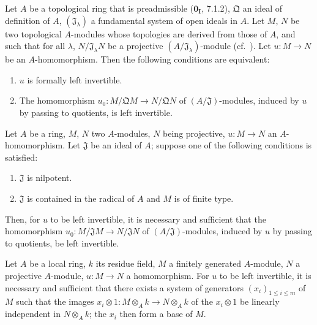 \begin{proposition}[19.1.9]
\label{0.19.1.9}
Let $A$ be a topological ring that is preadmissible ($\mathbf{0_I}$, 7.1.2), $\mathfrak{Q}$ an ideal of definition of $A$, $(\mathfrak{J}_\lambda)$ a fundamental system of open ideals in $A$.
Let $M$, $N$ be two topological $A$-modules whose topologies are derived from those of $A$, and such that for all $\lambda$, $N/\mathfrak{J}_\lambda N$ be a projective $(A/\mathfrak{J}_\lambda)$-module (cf.~).
Let $u:M\to N$ be an $A$-homomorphism.
Then the following conditions are equivalent:
\begin{enumerate}
  \item[a)] $u$ is formally left invertible.
  \item[b)] The homomorphism $u_0:M/\mathfrak{Q}M\to N/\mathfrak{Q}N$ of $(A/\mathfrak{J})$-modules, induced by $u$ by passing to quotients, is left invertible.
\end{enumerate}
\end{proposition}

\begin{proposition}[19.1.10]
\label{0.19.1.10}
Let $A$ be a ring, $M$, $N$ two $A$-modules, $N$ being projective, $u:M\to N$ an $A$-homomorphism.
Let $\mathfrak{J}$ be an ideal of $A$;
suppose one of the following conditions is satisfied:
\begin{enumerate}
  \item[(i)] $\mathfrak{J}$ is nilpotent.
  \item[(ii)] $\mathfrak{J}$ is contained in the radical of $A$ and $M$ is of finite type.
\end{enumerate}
Then, for $u$ to be left invertible, it is necessary and sufficient that the homomorphism $u_0:M/\mathfrak{J}M\to N/\mathfrak{J}N$ of $(A/\mathfrak{J})$-modules, induced by $u$ by passing to quotients, be left invertible.
\end{proposition}

\begin{corollary}[19.1.11]
\label{0.19.1.11}
Let $A$ be a local ring, $k$ its residue field, $M$ a finitely generated $A$-module, $N$ a projective $A$-module, $u:M\to N$ a homomorphism.
For $u$ to be left invertible, it is necessary and sufficient that there exists a system of generators $(x_i)_{1\leq i\leq m}$ of $M$ such that the images $x_i\otimes 1:M\otimes_A k\to N\otimes_A k$ of the $x_i\otimes 1$ be linearly independent in $N\otimes_A k$;
the $x_i$ then form a base of $M$.
\end{corollary}

